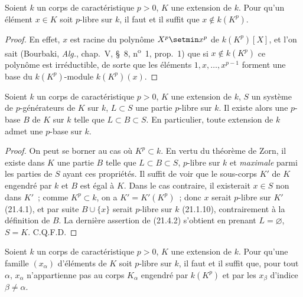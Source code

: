 \begin{lemma}[21.4.1]
\label{0.21.4.1-fr}
Soient $k$ un corps de caractéristique $p>0$, $K$ une extension de $k$.
Pour qu'un élément $x\in K$ soit $p$-libre sur $k$, il faut et il suffit que
$x\notin k(K^p)$.
\end{lemma}

\begin{proof}
En effet, $x$ est racine du polynôme $X^p\setmin x^p$ de $k(K^p)[X]$, et l'on sait
(Bourbaki, \emph{Alg.}, chap.~V, §~8, n\textsuperscript{o}~1, prop.~1) que si
$x\notin k(K^p)$ ce polynôme est irréductible, de sorte que les éléments
$1,x,\ldots,x^{p-1}$ forment une base du $k(K^p)$-module $k(K^p)(x)$.
\end{proof}

\begin{theorem}[21.4.2]
\label{0.21.4.2-fr}
Soient $k$ un corps de caractéristique $p>0$, $K$ une extension de $k$,
$S$ un système de $p$-générateurs de $K$ sur $k$, $L\subset S$ une partie
$p$-libre sur $k$. Il existe alors une $p$-base $B$ de $K$ sur $k$ telle que
$L\subset B\subset S$. En particulier, toute extension de $k$ admet une
$p$-base sur $k$.
\end{theorem}

\begin{proof}
On peut se borner au cas où $K^p\subset k$. En vertu du théorème de Zorn,
il existe dans $K$ une partie $B$ telle que $L\subset B\subset S$, $p$-libre
sur $k$ et \emph{maximale} parmi les parties de $S$ ayant ces propriétés. Il suffit
de voir que le sous-corps $K'$ de $K$ engendré par $k$ et $B$ est égal à $K$.
Dans le cas contraire, il existerait $x\in S$ non dans $K'$~; comme
$K^p\subset k$, on a $K'=K'(K^p)$~; donc $x$ serait $p$-libre sur $K'$
(21.4.1), et par suite $B\cup\{x\}$ serait $p$-libre sur $k$ (21.1.10),
contrairement à la définition de $B$. La dernière assertion de (21.4.2)
s'obtient en prenant $L=\varnothing$, $S=K$. C.Q.F.D.
\end{proof}

\begin{corollary}[21.4.3]
\label{0.21.4.3-fr}
Soient $k$ un corps de caractéristique $p>0$, $K$ une extension de $k$.
Pour qu'une famille $(x_\alpha)$ d'éléments de $K$ soit $p$-libre sur $k$,
il faut et il suffit que, pour tout $\alpha$, $x_\alpha$ n'appartienne pas au
corps $K_\alpha$ engendré par $k(K^p)$ et par les $x_\beta$ d'indice
$\beta\neq\alpha$.
\end{corollary}

